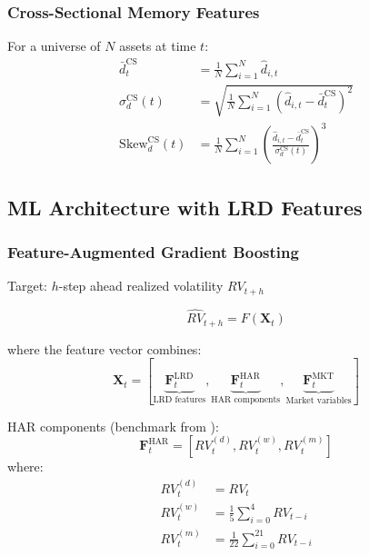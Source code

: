 \documentclass[11pt,a4paper]{article}
\theoremstyle{definition}
\newcommand{\dhat}{\hat{d}}
\begin{document}
\subsubsection{Cross-Sectional Memory Features}

For a universe of $N$ assets at time $t$:
\begin{align}
    \bar{d}_t^{\text{CS}} &= \frac{1}{N}\sum_{i=1}^N \dhat_{i,t} \\
    \sigma_d^{\text{CS}}(t) &= \sqrt{\frac{1}{N}\sum_{i=1}^N (\dhat_{i,t} - \bar{d}_t^{\text{CS}})^2} \\
    \text{Skew}_d^{\text{CS}}(t) &= \frac{1}{N}\sum_{i=1}^N \left(\frac{\dhat_{i,t} - \bar{d}_t^{\text{CS}}}{\sigma_d^{\text{CS}}(t)}\right)^3
\end{align}

\subsection{ML Architecture with LRD Features}

\subsubsection{Feature-Augmented Gradient Boosting}

Target: $h$-step ahead realized volatility $RV_{t+h}$

\begin{equation}
    \widehat{RV}_{t+h} = F(\mathbf{X}_t)
\end{equation}

where the feature vector combines:
\begin{equation}
    \mathbf{X}_t = \left[\underbrace{\mathbf{F}_t^{\text{LRD}}}_{\text{LRD features}}, \underbrace{\mathbf{F}_t^{\text{HAR}}}_{\text{HAR components}}, \underbrace{\mathbf{F}_t^{\text{MKT}}}_{\text{Market variables}}\right]
\end{equation}

HAR components (benchmark from \citealt{corsi2009simple}):
\begin{equation}
    \mathbf{F}_t^{\text{HAR}} = \left[RV_t^{(d)}, RV_t^{(w)}, RV_t^{(m)}\right]
\end{equation}
where:
\begin{align}
    RV_t^{(d)} &= RV_t \\
    RV_t^{(w)} &= \frac{1}{5}\sum_{i=0}^{4} RV_{t-i} \\
    RV_t^{(m)} &= \frac{1}{22}\sum_{i=0}^{21} RV_{t-i}
\end{align}
\end{document}
